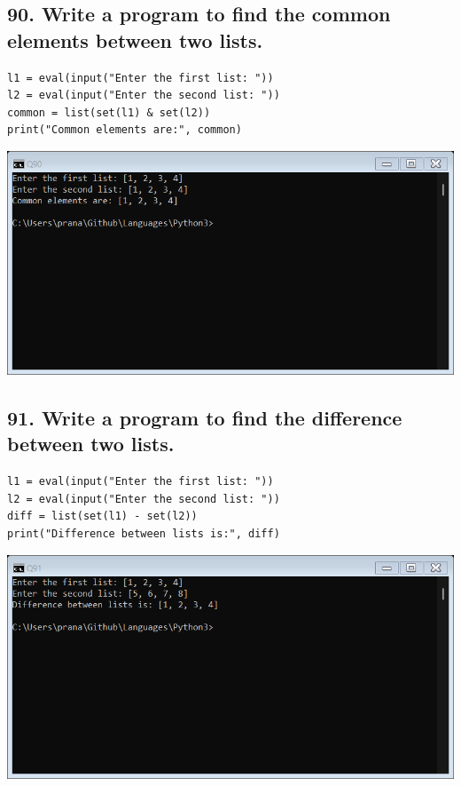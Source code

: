 \documentclass[12pt]{article}
\begin{document}
\subsection*{90. Write a program to find the common elements between two lists.}
\begin{verbatim}
l1 = eval(input("Enter the first list: "))
l2 = eval(input("Enter the second list: "))
common = list(set(l1) & set(l2))
print("Common elements are:", common)
\end{verbatim}
\includegraphics[width=\linewidth]{images/90.png}

\subsection*{91. Write a program to find the difference between two lists.}
\begin{verbatim}
l1 = eval(input("Enter the first list: "))
l2 = eval(input("Enter the second list: "))
diff = list(set(l1) - set(l2))
print("Difference between lists is:", diff)
\end{verbatim}
\includegraphics[width=\linewidth]{images/91.png}
\end{document}
